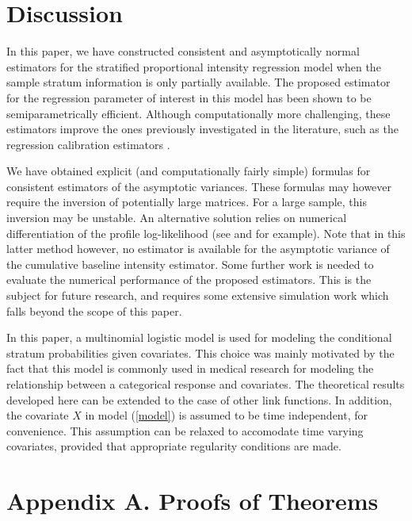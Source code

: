 \documentclass{statsoc}
\begin{document}
\section{Discussion}\label{disc}

In this paper, we have constructed consistent and asymptotically normal estimators for the stratified proportional intensity regression model when the sample stratum information is only partially available. The proposed estimator for the regression parameter of interest in this model has been shown to be semiparametrically efficient. Although computationally more challenging, these estimators improve the ones previously investigated in the literature, such as the regression calibration estimators \citep{duplec}.

We have obtained explicit (and computationally fairly simple) formulas for consistent estimators of the asymptotic variances. These formulas may however require the inversion of potentially large matrices. For a large sample, this inversion may be unstable. An alternative solution relies on numerical differentiation of the profile log-likelihood (see \cite{mrvdv} and \cite{chen99} for example). Note that in this latter method however, no estimator is available for the asymptotic variance of the cumulative baseline intensity estimator. Some further work is needed to evaluate the numerical performance of the proposed estimators. This is the subject for future research, and requires some extensive simulation work which falls beyond the scope of this paper.

In this paper, a multinomial logistic model \citep{jobson} is used for modeling the conditional stratum probabilities given covariates. This choice was mainly motivated by the fact that this model is commonly used in medical research for modeling the relationship between a categorical response and covariates. The theoretical results developed here can be extended to the case of other link functions. In addition, the covariate $X$ in model (\ref{model}) is assumed to be time independent, for convenience. This assumption can be relaxed to accomodate time varying covariates, provided that appropriate regularity conditions are made.

\section*{Appendix A. Proofs of Theorems}
\end{document}
